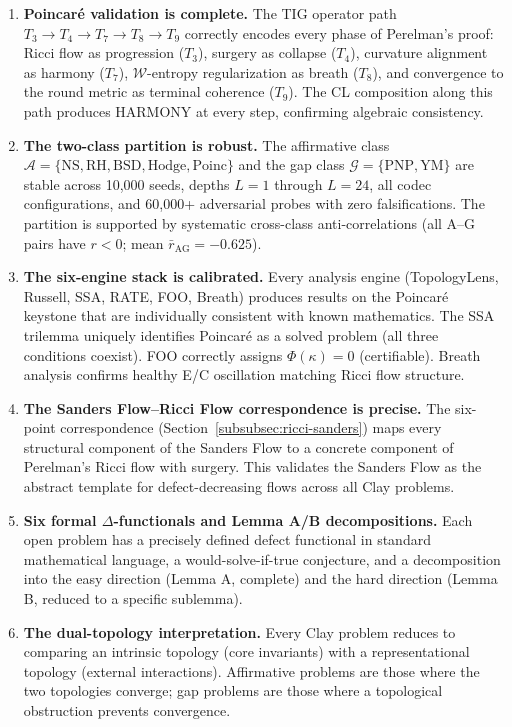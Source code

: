 \documentclass[11pt]{article}
\begin{document}
\begin{enumerate}
\item \textbf{Poincar\'e validation is complete.}  The TIG operator path
$T_3 \to T_4 \to T_7 \to T_8 \to T_9$ correctly encodes every phase
of Perelman's proof: Ricci flow as progression ($T_3$), surgery as
collapse ($T_4$), curvature alignment as harmony ($T_7$),
$\mathcal{W}$-entropy regularization as breath ($T_8$), and convergence
to the round metric as terminal coherence ($T_9$).  The CL composition
along this path produces HARMONY at every step, confirming algebraic
consistency.

\item \textbf{The two-class partition is robust.}  The affirmative
class $\mathcal{A} = \{\mathrm{NS}, \mathrm{RH}, \mathrm{BSD},
\mathrm{Hodge}, \mathrm{Poinc}\}$ and the gap class
$\mathcal{G} = \{\mathrm{PNP}, \mathrm{YM}\}$ are stable across
10,000 seeds, depths $L = 1$ through $L = 24$, all codec configurations,
and 60,000+ adversarial probes with zero falsifications.  The partition
is supported by systematic cross-class anti-correlations (all A--G pairs
have $r < 0$; mean $\bar{r}_{\mathrm{AG}} = -0.625$).

\item \textbf{The six-engine stack is calibrated.}  Every analysis
engine (TopologyLens, Russell, SSA, RATE, FOO, Breath) produces results
on the Poincar\'e keystone that are individually consistent with known
mathematics.  The SSA trilemma uniquely identifies Poincar\'e as a
solved problem (all three conditions coexist).  FOO correctly assigns
$\Phi(\kappa) = 0$ (certifiable).  Breath analysis confirms healthy
E/C oscillation matching Ricci flow structure.

\item \textbf{The Sanders Flow--Ricci Flow correspondence is precise.}
The six-point correspondence (Section~\ref{subsubsec:ricci-sanders})
maps every structural component of the Sanders Flow to a concrete
component of Perelman's Ricci flow with surgery.  This validates the
Sanders Flow as the abstract template for defect-decreasing flows
across all Clay problems.

\item \textbf{Six formal $\Delta$-functionals and Lemma A/B
decompositions.}  Each open problem has a precisely defined defect
functional in standard mathematical language, a would-solve-if-true
conjecture, and a decomposition into the easy direction (Lemma A,
complete) and the hard direction (Lemma B, reduced to a specific
sublemma).

\item \textbf{The dual-topology interpretation.}  Every Clay problem
reduces to comparing an intrinsic topology (core invariants) with a
representational topology (external interactions).  Affirmative
problems are those where the two topologies converge; gap problems are
those where a topological obstruction prevents convergence.
\end{enumerate}
\end{document}
